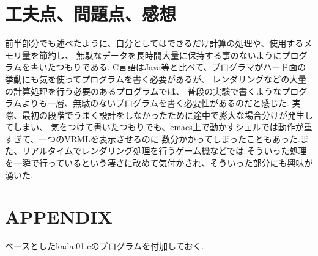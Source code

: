 \documentclass[a4j,dvipdfmx]{jsarticle}
\begin{document}
\section{工夫点、問題点、感想}
前半部分でも述べたように、自分としてはできるだけ計算の処理や、使用するメモリ量を節約し、
無駄なデータを長時間大量に保持する事のないようにプログラムを書いたつもりである.
C言語はJava等と比べて、プログラマがハード面の挙動にも気を使ってプログラムを書く必要があるが、
レンダリングなどの大量の計算処理を行う必要のあるプログラムでは、
普段の実験で書くようなプログラムよりも一層、無駄のないプログラムを書く必要性があるのだと感じた.
実際、最初の段階でうまく設計をしなかったために途中で膨大な場合分けが発生してしまい、
気をつけて書いたつもりでも、emacs上で動かすシェルでは動作が重すぎて、一つのVRMLを表示させるのに
数分かかってしまったこともあった.また、リアルタイムでレンダリング処理を行うゲーム機などでは
そういった処理を一瞬で行っているという凄さに改めて気付かされ、そういった部分にも興味が湧いた.


\section{APPENDIX}
ベースとしたkadai01.cのプログラムを付加しておく.

\end{document}
